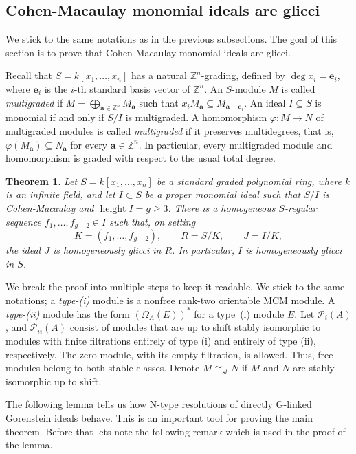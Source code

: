 \documentclass[11pt,letterpaper]{amsart}
\DeclareMathOperator{\height}{height}
\theoremstyle{plain}
\newtheorem{thm}{Theorem}[section]
\theoremstyle{definition}
\theoremstyle{remark}
\begin{document}
\subsection{Cohen-Macaulay monomial ideals are glicci}

We stick to the same notations as in the previous subsections. The goal of this section is to prove that Cohen-Macaulay monomial ideals are glicci. 


Recall that $S=k[x_1,\ldots,x_n]$ has a natural
$\mathbb Z^n$-grading, defined by
$\deg x_i=\mathbf e_i$, where $\mathbf e_i$ is
the $i$-th standard basis vector of $\mathbb Z^n$.
An $S$-module $M$ is called \emph{multigraded} if $M=\bigoplus_{\mathbf a\in\mathbb Z^n}M_{\mathbf a}$ such that $x_iM_{\mathbf a}\subseteq M_{\mathbf a+\mathbf e_i}$.
An ideal $I\subseteq S$ is monomial if and only
if $S/I$ is multigraded. A homomorphism
$\varphi:M\to N$ of multigraded modules is called
\emph{multigraded} if it preserves multidegrees,
that is,
$\varphi(M_{\mathbf a})\subseteq N_{\mathbf a}$
for every $\mathbf a\in\mathbb Z^n$.
In particular, every multigraded module and
homomorphism is graded with respect to the
usual total degree.



\begin{thm}\label{thm:main}
Let $S=k[x_1,\ldots,x_n]$ be a standard graded polynomial ring, where $k$ is an infinite field,
and let $I\subset S$ be a proper monomial ideal such that $S/I$ is
Cohen-Macaulay and $\height I=g\geq3$. There is a homogeneous
$S$-regular sequence $f_1,\ldots,f_{g-2}\in I$ such that, on setting
\[
 K=(f_1,\ldots,f_{g-2}),\qquad R=S/K,\qquad J=I/K,
\]
the ideal $J$ is homogeneously glicci in $R$. In particular, $I$ is
homogeneously glicci in $S$.
\end{thm}

We break the proof into multiple steps to keep it readable. We stick to the same notations; a \emph{type-(i)} module is a
nonfree rank-two orientable MCM module. A \emph{type-(ii)} module has
the form \((\Omega_A(E))^*\)
for a type~(i) module $E$. 
Let $\mathcal{P}_{i}(A)$, and $\mathcal{P}_{ii}(A)$ consist of modules that are up to shift stably isomorphic to modules with finite filtrations entirely of type (i) and entirely of type (ii), respectively. The zero module, with its empty
filtration, is allowed. Thus, free modules belong to both stable classes. Denote $M\cong_{st} N$ if $M$ and $N$ are stably isomorphic up to shift. 

The following lemma tells us how N-type resolutions of directly G-linked Gorenstein ideals behave. This is an important tool for proving the main theorem. Before that lets note the following remark which is used in the proof of the lemma. 
\end{document}
